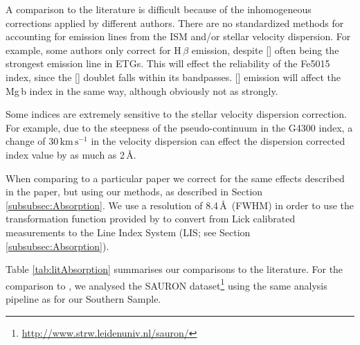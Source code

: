 			A comparison to the literature is difficult because of the inhomogeneous corrections applied by different authors. There are no standardized methods for accounting for emission lines from the ISM and/or stellar velocity dispersion. For example, some authors only correct for H\,$\beta$ emission, despite [] often being the strongest emission line in ETGs. This will effect the reliability of the Fe5015 index, since the [] doublet falls within its bandpasses. [] emission will affect the Mg\,b index in the same way, although obviously not as strongly.

			Some indices are extremely sensitive to the stellar velocity dispersion correction. For example, due to the steepness of the pseudo-continuum in the G4300 index, a change of $30 \, \mathrm{km\,s^{-1}}$ in the velocity dispersion can effect the dispersion corrected index value by as much as 2\,\AA.

			When comparing to a particular paper we correct for the same effects described in the paper, but using our methods, as described in Section \ref{subsubsec:Absorption}. We use a resolution of 8.4\,\AA\ (FWHM) in order to use the transformation function provided by \citet{Vazdekis2010} to convert from Lick calibrated measurements to the Line Index System (LIS; see Section \ref{subsubsec:Absorption}). 

			Table \ref{tab:litAbsorption} summarises our comparisons to the literature. For the comparison to \citet{Vazdekis2010}, we analysed the SAURON dataset\footnote{\url{http://www.strw.leidenuniv.nl/sauron/}} \citep{Emsellem2004} using the same analysis pipeline as for our Southern Sample. 


